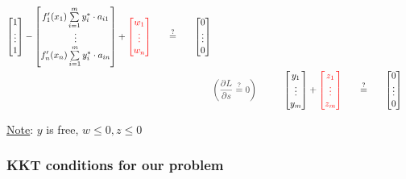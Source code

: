 \documentclass{article}
\begin{document}
\begin{itemize}
\begin{align*}
\begin{bmatrix}
1 \\
\vdots\\
1\\
\end{bmatrix} 
- 
\begin{bmatrix}
f'_1(x_1)\sum\limits_{i=1}^m y_i^*\cdot a_{i1} \\
\vdots\\
f'_n(x_n)\sum\limits_{i=1}^m y_i^*\cdot a_{in}\\
\end{bmatrix} 
+
\color{red}
\begin{bmatrix}
w_1\\
\vdots\\
w_n\\
\end{bmatrix}
\color{black}
\hspace{0.6cm}
\stackrel{?}{=} 
\hspace{0.6cm}
\begin{bmatrix}
0 \\
\vdots\\
0\\
\end{bmatrix}\\
 &\color{darkgray}\left(\dfrac{\partial L}{\partial s} \stackrel{?}{=} 0\right) \hspace*{1cm} \color{black} 
 \begin{bmatrix}
 y_1  \\
 \vdots\\
 y_m
 \end{bmatrix} + 
 \color{red} 
 \begin{bmatrix}
 z_1  \\
 \vdots\\
 z_m
 \end{bmatrix}
 \color{black}
 \hspace{0.6cm}
\stackrel{?}{=} 
\hspace{0.6cm}
\begin{bmatrix}
0 \\
\vdots\\
0
\end{bmatrix}
\end{align*}

\underline{Note}: $y$ is free, $w \le 0, z\le 0$

\subsubsection{KKT conditions for our problem}


\end{itemize}
\end{document}
